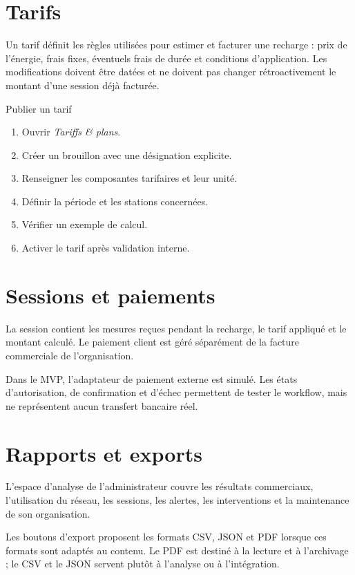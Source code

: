 \section{Tarifs}

Un tarif définit les règles utilisées pour estimer et facturer une recharge :
prix de l'énergie, frais fixes, éventuels frais de durée et conditions
d'application. Les modifications doivent être datées et ne doivent pas changer
rétroactivement le montant d'une session déjà facturée.

\begin{procedurebox}{Publier un tarif}
  \begin{enumerate}[leftmargin=*]
    \item Ouvrir \emph{Tariffs \& plans}.
    \item Créer un brouillon avec une désignation explicite.
    \item Renseigner les composantes tarifaires et leur unité.
    \item Définir la période et les stations concernées.
    \item Vérifier un exemple de calcul.
    \item Activer le tarif après validation interne.
  \end{enumerate}
\end{procedurebox}

\section{Sessions et paiements}

La session contient les mesures reçues pendant la recharge, le tarif appliqué
et le montant calculé. Le paiement client est géré séparément de la facture
commerciale de l'organisation.

Dans le MVP, l'adaptateur de paiement externe est simulé. Les états
d'autorisation, de confirmation et d'échec permettent de tester le workflow,
mais ne représentent aucun transfert bancaire réel.

\section{Rapports et exports}

L'espace d'analyse de l'administrateur couvre les résultats commerciaux,
l'utilisation du réseau, les sessions, les alertes, les interventions et la
maintenance de son organisation.

Les boutons d'export proposent les formats CSV, JSON et PDF lorsque ces formats
sont adaptés au contenu. Le PDF est destiné à la lecture et à l'archivage ; le
CSV et le JSON servent plutôt à l'analyse ou à l'intégration.

